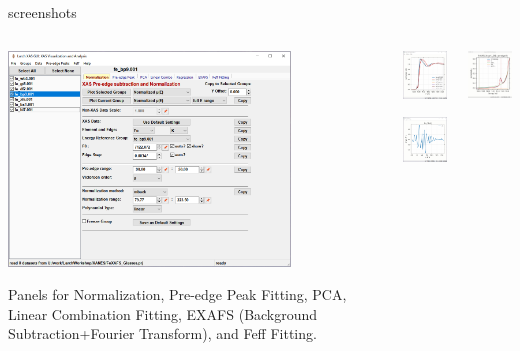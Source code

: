 \begin{slide}{ {\xasviewer} screenshots}

  \begin{cenpage}{145mm}

    \begin{columns}
    \begin{column}{75mm}
      \includegraphics[width=75mm]{figs/Screenshots/XASViewer_Main}

      Panels for Normalization, Pre-edge Peak Fitting, PCA, Linear
      Combination Fitting, EXAFS (Background Subtraction+Fourier
      Transform), and Feff Fitting.

      \vfill
    \end{column}
    \begin{column}{30mm}
      \includegraphics[width=30mm]{figs/Screenshots/XASViewer_MainPlot}

      \vmm
      \includegraphics[width=30mm]{figs/Screenshots/XASViewer_EXAFS_plot1}

      \vmm \vfill
    \end{column}

      \begin{column}{30mm}
        \includegraphics[width=30mm]{figs/Screenshots/XASViewer_plot_peakfit}


\end{column}
\end{columns}
\end{cenpage}
\end{slide}
